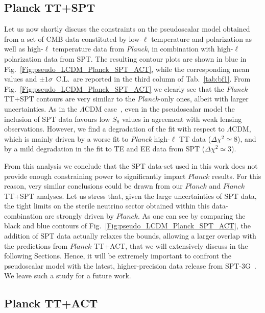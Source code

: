 \documentclass[a4paper,11pt]{article}
\begin{document}
\subsection{Planck TT+SPT}


Let us now shortly discuss the constraints on the pseudoscalar model obtained from a set of CMB data constituted by low-$\ell$ temperature and polarization as well as high-$\ell$ temperature data from {\emph{Planck}}, in combination with high-$\ell$ polarization data from SPT.
The resulting contour plots are shown in blue in Fig.~\ref{Fig:pseudo_LCDM_Planck_SPT_ACT}, while the corresponding mean values and $\pm 1 \sigma$~C.L.\ are reported in the third column of Tab.~\ref{tab:bf1}. From Fig.~\ref{Fig:pseudo_LCDM_Planck_SPT_ACT} we clearly see that the \textit{Planck} TT+SPT contours are very similar to the \textit{Planck}-only ones, albeit with larger uncertainties.
As in the $\Lambda$CDM case~\cite{Henning:2017nuy,Chudaykin:2020acu}, even in the pseudoscalar model the inclusion of SPT data favours low $S_8$ values in agreement with weak lensing observations.
However, we find a degradation of the fit with respect to $\Lambda$CDM, which is mainly driven by a worse fit to \textit{Planck} high-$\ell$ TT data ($\Delta\chi^2\simeq8$), and by a mild degradation in the fit to TE and EE data from SPT ($\Delta\chi^2\simeq3$).

From this analysis we conclude that the SPT data-set used in this work does not provide enough constraining power to significantly impact $Planck$ results. For this reason, very similar conclusions could be drawn from our $Planck$ and $Planck$ TT+SPT analyses. Let us stress that, given the large uncertainties of SPT data, the tight limits on the sterile neutrino sector obtained within this data-combination are strongly driven by $Planck$. As one can see by comparing the black and blue contours of Fig.~\ref{Fig:pseudo_LCDM_Planck_SPT_ACT}, the addition of SPT data actually relaxes the bounds, allowing a larger overlap with the predictions from $Planck$ TT+ACT, that we will extensively discuss in the following Sections. Hence, it will be extremely important to confront the pseudoscalar model with the latest, higher-precision data release from SPT-3G~\cite{SPT-3G:2021eoc}. We leave such a study for a future work.



\subsection{Planck TT+ACT}\label{sec:act1}
\end{document}
